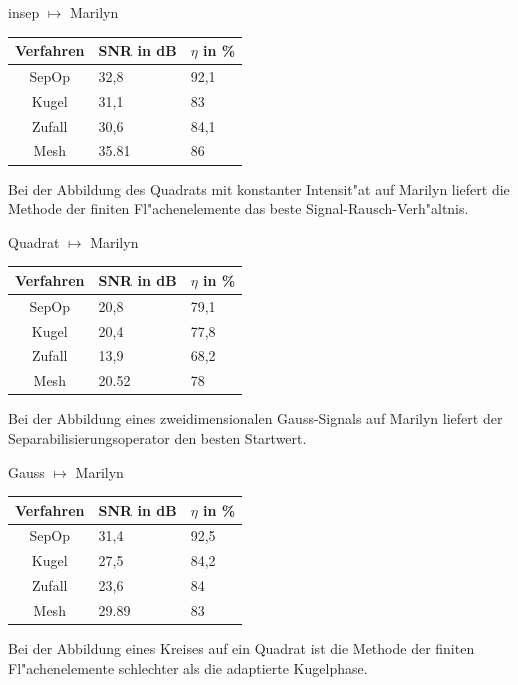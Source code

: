 \documentclass[11pt,a4paper]{article}
\begin{document}
  \begin{center}{\large insep	$\mapsto$ Marilyn} \\
  \begin{tabular}{|c|l|l|} \hline  
    Verfahren   & SNR in dB & $\eta$ in \% \\ \hline\hline
    SepOp	& 32,8	    & 92,1         \\	
    Kugel	& 31,1	    & 83	   \\    
    Zufall	& 30,6	    & 84,1	   \\
    Mesh        & 35.81	    & 86	   \\ \hline
  \end{tabular}\end{center}

  Bei der Abbildung des Quadrats mit konstanter Intensit"at auf Marilyn liefert
  die Methode der finiten Fl"achenelemente das beste Signal-Rausch-Verh"altnis.
\newpage
  \begin{center}{\large Quadrat $\mapsto$ Marilyn} \\		
  \begin{tabular}{|c|l|l|} \hline
    Verfahren   & SNR in dB & $\eta$ in \% \\ \hline\hline
    SepOp	& 20,8	& 79,1	    \\
    Kugel	& 20,4	& 77,8	    \\
    Zufall	& 13,9	& 68,2	    \\
    Mesh	& 20.52	& 78	    \\ \hline
  \end{tabular}\end{center} 

  Bei der Abbildung eines zweidimensionalen Gauss-Signals auf Marilyn liefert
  der Separabilisierungsoperator den besten Startwert.

  \begin{center}{\large Gauss $\mapsto$ Marilyn} \\	
  \begin{tabular}{|c|l|l|} \hline
    Verfahren   & SNR in dB & $\eta$ in \% \\ \hline\hline
    SepOp	& 31,4	& 92,5 \\	
    Kugel	& 27,5	& 84,2 \\	
    Zufall	& 23,6	& 84   \\	
    Mesh	& 29.89	& 83   \\ \hline
  \end{tabular}\end{center}

  Bei der Abbildung eines Kreises auf ein Quadrat ist die Methode der finiten
  Fl"achenelemente schlechter als die adaptierte Kugelphase.  
\end{document}
